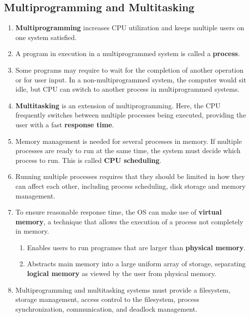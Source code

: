 \documentclass[journal,12pt,twocolumn]{IEEEtran}
\begin{document}
\subsection{Multiprogramming and Multitasking}
\begin{enumerate}
    \item \textbf{Multiprogramming} increases CPU utilization and keeps 
    multiple users on one system satisfied.
    \item A program in execution in a multiprogrammed system is called a 
    \textbf{process}.
    \item Some programs may require to wait for the completion of another 
    operation or for user input. In a non-multiprogrammed system, the computer 
    would sit idle, but CPU can switch to another process in multiprogrammed 
    systems.
    \item \textbf{Multitasking} is an extension of multiprogramming. Here, the 
    CPU frequently switches between multiple processes being executed, 
    providing the user with a fast \textbf{response time}.
    \item Memory management is needed for several processes in memory. If multiple 
    processes are ready to run at the same time, the system must decide which 
    process to run. This is called \textbf{CPU scheduling}.
    \item Running multiple processes requires that they should be limited in 
    how they can affect each other, including process scheduling, disk storage 
    and memory management.
    \item To ensure reasonable response time, the OS can make use of 
    \textbf{virtual memory}, a technique that allows the execution of a process 
    not completely in memory.
    \begin{enumerate}
        \item Enables users to run programes that are larger than 
        \textbf{physical memory}.
        \item Abstracts main memory into a large uniform array of storage, 
        separating \textbf{logical memory} as viewed by the user from physical 
        memory.
    \end{enumerate}
    \item Multiprogramming and multitasking systems must provide a filesystem, 
    storage management, access control to the filesystem, process synchronization, 
    communication, and deadlock management.
\end{enumerate}
\end{document}
